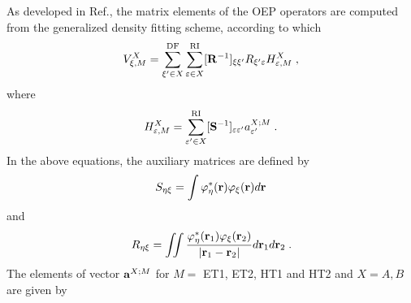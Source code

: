 As developed in Ref.\cite{Blasiak.Bednarska.Choluj.Bartkowiak.XXXX}, 
the matrix elements of the OEP operators
are computed from the generalized density fitting scheme, according to which
%
\begin{equation}\label{e:a:voep}
 V^X_{\xi, M} = \sum_{\xi'\in X}^{\rm DF} 
                \sum_{\varepsilon\in X}^{\rm RI}
                [{\bf R}^{-1}]_{\xi\xi'} R_{\xi'\varepsilon} H^X_{\varepsilon, M} \;,
\end{equation}
%
where
%
\begin{equation}
 H^X_{\varepsilon, M} = \sum_{\varepsilon'\in X}^{\rm RI}
                        [{\bf S}^{-1}]_{\varepsilon\varepsilon'} a_{\varepsilon'}^{X; M} \;.
\end{equation}
%
In the above equations, the auxiliary matrices are defined by
%
\begin{equation}
 S_{\eta\xi}  = \int 
                       \varphi^*_\eta({\bf r}) \varphi_\xi({\bf r}) 
                 d{\bf r} 
\end{equation}
%
and
%
\begin{equation}
 R_{\eta\xi}  = \iint 
                       \frac{ \varphi^*_\eta({\bf r}_1) \varphi_\xi({\bf r}_2) } 
                            {\vert {\bf r}_1 - {\bf r}_2\vert}  
                 d{\bf r}_1 d{\bf r}_2 \;.
\end{equation}
%
The elements of vector ${\bf a}^{X;M}$ for $M=$ ET1, ET2, HT1 and HT2 and $X=A, B$ are given by
%
